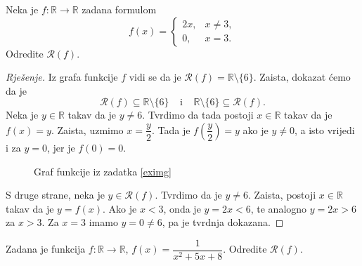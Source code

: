 \begin{exercise}
\label{eximg}
Neka je $f : \mathbb{R}\to \mathbb{R}$ zadana formulom
$$f(x)=\begin{cases}
2x, & x\neq 3, \\
0, & x=3.
   \end{cases}$$
Odredite $\mathcal{R}(f)$.
\end{exercise}
\begin{proof}[Rješenje]
Iz grafa funkcije $f$ vidi se da je $\mathcal{R}(f)=\mathbb{R}\setminus \{6\}$. Zaista, dokazat ćemo da je $$\mathcal{R}(f)\subseteq \mathbb{R}\setminus \{6\}\;\;\;\;\text{i}\;\;\;\;\mathbb{R}\setminus \{6\}\subseteq \mathcal{R}(f).$$
Neka je $y\in \mathbb{R}$ takav da je $y\neq 6$. Tvrdimo da tada postoji $x\in \mathbb{R}$ takav da je $f(x)=y$. Zaista, uzmimo $x=\dfrac{y}{2}$. Tada je $f\left(\dfrac{y}{2}\right)=y$ ako je $y\neq 0$, a isto vrijedi i za $y=0$, jer je $f(0)=0$.
\begin{figure}[ht]
\begin{center}
\end{center}
\caption{\label{exim1} Graf funkcije iz zadatka \ref{eximg}}
\end{figure}

S druge strane, neka je $y\in \mathcal{R}(f)$. Tvrdimo da je $y\neq 6$. Zaista, postoji $x\in \mathbb{R}$ takav da je $y=f(x)$. Ako je $x<3$, onda je $y=2x<6$, te analogno $y=2x>6$ za $x>3$. Za $x=3$ imamo $y=0\neq 6$, pa je tvrdnja dokazana.
\end{proof}
\begin{exercise}
\label{eximg2}
Zadana je funkcija $f : \mathbb{R}\to \mathbb{R}$, $f(x)=\dfrac{1}{x^2+5x+8}$. Odredite $\mathcal{R}(f)$.
\end{exercise}
